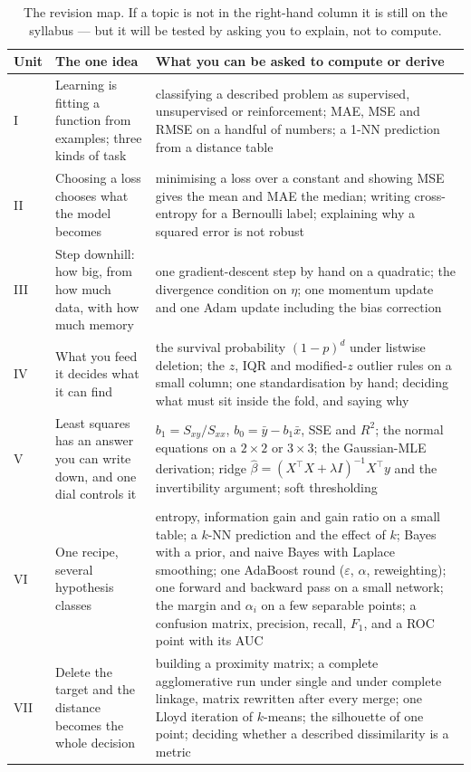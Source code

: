 \documentclass[11pt]{article}
\begin{document}
\begin{table}[t]
  \centering \small
  \begin{tabular}{@{}p{1.1cm}p{4.4cm}p{8.3cm}@{}}
    \toprule
    \textbf{Unit} & \textbf{The one idea} & \textbf{What you can be asked to
      compute or derive} \\
    \midrule
    I &
    Learning is fitting a function from examples; three kinds of task &
    classifying a described problem as supervised, unsupervised or
    reinforcement; MAE, MSE and RMSE on a handful of numbers; a 1-NN
    prediction from a distance table \\[0.35em]
    II &
    Choosing a loss chooses what the model becomes &
    minimising a loss over a constant and showing MSE gives the mean and MAE
    the median; writing cross-entropy for a Bernoulli label; explaining why a
    squared error is not robust \\[0.35em]
    III &
    Step downhill: how big, from how much data, with how much memory &
    one gradient-descent step by hand on a quadratic; the divergence
    condition on $\eta$; one momentum update and one Adam update including
    the bias correction \\[0.35em]
    IV &
    What you feed it decides what it can find &
    the survival probability $(1-p)^d$ under listwise deletion; the $z$, IQR
    and modified-$z$ outlier rules on a small column; one standardisation by
    hand; deciding what must sit inside the fold, and saying why \\[0.35em]
    V &
    Least squares has an answer you can write down, and one dial controls it
    &
    $b_1 = S_{xy}/S_{xx}$, $b_0 = \bar y - b_1 \bar x$, SSE and $R^2$; the
    normal equations on a $2\times2$ or $3\times3$; the Gaussian-MLE
    derivation; ridge $\hat\beta = (X^\top X + \lambda I)^{-1} X^\top y$ and
    the invertibility argument; soft thresholding \\[0.35em]
    VI &
    One recipe, several hypothesis classes &
    entropy, information gain and gain ratio on a small table; a $k$-NN
    prediction and the effect of $k$; Bayes with a prior, and naive Bayes
    with Laplace smoothing; one AdaBoost round ($\varepsilon$, $\alpha$,
    reweighting); one forward and backward pass on a small network; the
    margin and $\alpha_i$ on a few separable points; a confusion matrix,
    precision, recall, $F_1$, and a ROC point with its AUC \\[0.35em]
    VII &
    Delete the target and the distance becomes the whole decision &
    building a proximity matrix; a complete agglomerative run under single
    and under complete linkage, matrix rewritten after every merge; one
    Lloyd iteration of $k$-means; the silhouette of one point; deciding
    whether a described dissimilarity is a metric \\
    \bottomrule
  \end{tabular}
  \caption{The revision map. If a topic is not in the right-hand column it is
  still on the syllabus --- but it will be tested by asking you to explain,
  not to compute.}
  \label{tab:map}
\end{table}
\end{document}

